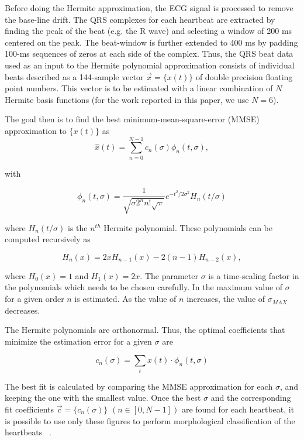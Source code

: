 \documentclass[conference]{IEEEtran}
\begin{document}
Before doing the Hermite approximation, the ECG signal is processed to remove
the base-line drift.  The QRS complexes for each heartbeat are extracted by 
finding the peak of the beat (e.g. the R wave) and selecting a  window of 200 ms centered on the peak. 
The beat-window is further extended to 400 ms by padding 100-ms sequences of zeros at each side of the complex. 
Thus, the QRS beat data used as an input to the Hermite polynomial approximation
consists of individual beats described as a 144-sample vector $\vec{x}=\{x(t)\}$ of double
precision floating point numbers. 
This vector is to be estimated with a linear combination of $N$ Hermite basis functions (for
the work reported in this paper, we use $N=6$).

The goal then is to find the best minimum-mean-square-error (MMSE)  approximation to
$\{ x(t)\}$ as 
\begin{equation}\label{eqn:hat}
\hat{x}(t)=\sum_{n=0}^{N-1}c_n(\sigma )\phi_n(t,\sigma),
\end{equation}

\noindent with

\begin{equation}\label{eqn:phi}
\phi_n(t,\sigma )=\frac{1}{\sqrt{\sigma 2^n n!\sqrt{\pi}}}e^{-t^2/2\sigma^2}H_n(t/\sigma) 
\end{equation}

\noindent where $H_n(t/\sigma)$ is the $n^{th}$ Hermite polynomial. 
These polynomials can be computed recursively as

\begin{equation}
H_n(x)=2xH_{n-1}(x)-2(n-1)H_{n-2}(x),
\end{equation}

\noindent where $H_0(x)=1$ and $H_1(x)=2x$.
The parameter $\sigma$ is a time-scaling factor in the polynomials which needs
to be chosen carefully.   In \cite{j:lagerholm00} the maximum value 
of $\sigma$ for a given order $n$ is estimated.  As the value of $n$ increases, the value of $\sigma_{MAX}$ decreases.

The Hermite polynomials are orthonormal.  Thus, the optimal coefficients that 
minimize the estimation error for a given $\sigma$ are

\begin{equation}\label{eqn:c}
c_n(\sigma)=\sum_{t} x(t)\cdot \phi_n(t,\sigma) 
\end{equation}

The best fit is calculated by comparing the MMSE approximation for each $\sigma$, and keeping
the one with the smallest value.
Once the best $\sigma$ and the corresponding fit coefficients $\vec{c}=\{c_n(\sigma)\}$  \mbox{$(n\in [0,N-1])$} 
are found for each heartbeat, it is possible to use only these figures to perform morphological 
classification of the heartbeats \textrm{~\cite{j:lagerholm00}}.
\end{document}
